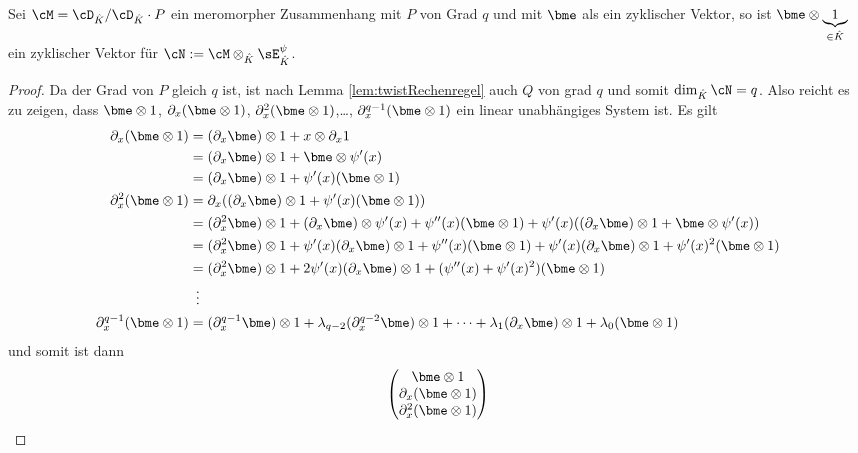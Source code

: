 \begin{comment}
\cite[Chap 5 §2]{coutinho1995primer}
\end{comment}
\begin{lem}
Sei $\cM=\cD_{\hat K}/\cD_{\hat K}\cdot P$ ein meromorpher Zusammenhang mit $P$
von Grad $q$ und mit $\bme$ als ein zyklischer Vektor, so ist $\bme\otimes
\underset{\in\hat K}{\underbrace{1}}$ ein zyklischer Vektor für
$\cN:=\cM\otimes_{\hat K}\sE_{\hat K}^\psi$.
\end{lem}
\begin{proof}
Da der Grad von $P$ gleich $q$ ist, ist nach Lemma \ref{lem:twistRechenregel}
auch $Q$ von grad $q$ und somit $\dim_{\hat K}\cN= q$.
Also reicht es zu zeigen, dass $\bme\otimes 1$, $\partial_x(\bme\otimes 1)$,
$\partial_x^2(\bme\otimes 1)$,\dots, $\partial_x^{q-1}(\bme\otimes 1)$ ein
linear unabhängiges System ist.  Es gilt
\begin{align*}
\partial_x(\bme\otimes 1) &= (\partial_x \bme)\otimes 1 + x\otimes \partial_x 1\\
  &= (\partial_x \bme)\otimes 1 + \bme\otimes \psi'(x)\\
  &= (\partial_x \bme)\otimes 1 +  \psi'(x)(\bme\otimes 1)\\
\partial_x^2(\bme\otimes 1) &= \partial_x((\partial_x \bme)\otimes 1 +
    \psi'(x)(\bme\otimes 1))\\
  &= (\partial_x^2 \bme)\otimes 1 + (\partial_x \bme)\otimes \psi'(x)
  + \psi''(x)(\bme\otimes 1)
  + \psi'(x)((\partial_x \bme)\otimes 1 + \bme\otimes \psi'(x))\\
  &= (\partial_x^2 \bme)\otimes 1
  + \psi'(x)(\partial_x \bme)\otimes 1
  + \psi''(x)(\bme\otimes 1)
  + \psi'(x)(\partial_x \bme)\otimes 1
  + \psi'(x)^2(\bme\otimes 1)\\
  &= (\partial_x^2 \bme)\otimes 1
  + 2\psi'(x)(\partial_x \bme)\otimes 1
  + (\psi''(x) + \psi'(x)^2)(\bme\otimes 1)\\
  &\,\,\,\vdots\\
\partial_x^{q-1}(\bme\otimes 1) &= (\partial_x^{q-1} \bme)\otimes 1
  + \lambda_{q-2}(\partial_x^{q-2} \bme)\otimes 1
  +\dots
  + \lambda_{1}(\partial_x \bme)\otimes 1
  + \lambda_0(\bme\otimes 1)\\
\end{align*}
und somit ist dann
\[
\begin{pmatrix}
\bme\otimes 1\\
\partial_x(\bme\otimes 1)\\
\partial_x^2(\bme\otimes 1)\\

\end{pmatrix}\]
\end{proof}

